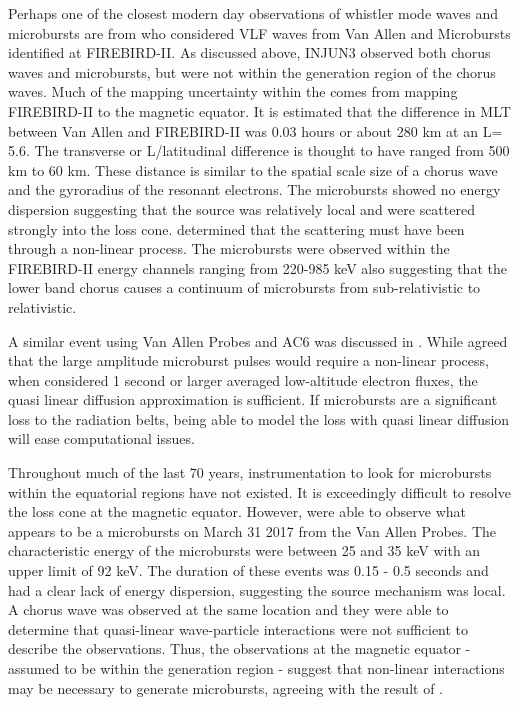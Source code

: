 \documentclass[referee,a4paper,12pt,traditabstract]{swsc}
\begin{document}
\begin{linenumbers}
Perhaps one of the closest modern day observations of whistler mode waves and microbursts are from \citet{Breneman2017} who considered VLF waves from Van Allen and Microbursts identified at FIREBIRD-II. As discussed above, INJUN3 observed both chorus waves and microbursts, but were not within the generation region of the chorus waves. Much of the mapping uncertainty within the \citet{Breneman2017} comes from mapping FIREBIRD-II to the magnetic equator. It is estimated that the difference in MLT between Van Allen and FIREBIRD-II was 0.03 hours or about 280 km at an L= 5.6. The transverse or L/latitudinal difference is thought to have ranged from 500 km to 60 km. These distance is similar to the spatial scale size of a chorus wave and the gyroradius of the resonant electrons. The microbursts showed no energy dispersion suggesting that the source was relatively local and were scattered strongly into the loss cone. \citet{Breneman2017} determined that the scattering must have been through a non-linear process. The microbursts were observed within the FIREBIRD-II energy channels ranging from 220-985 keV also suggesting that the lower band chorus causes a continuum of microbursts from sub-relativistic to relativistic. 

A similar event using Van Allen Probes and AC6 was discussed in \citet{Mozer2018}. While \citet{Mozer2018} agreed that the large amplitude microburst pulses would require a non-linear process, when considered 1 second or larger averaged low-altitude electron fluxes, the quasi linear diffusion approximation is sufficient. If microbursts are a significant loss to the radiation belts, being able to model the loss with quasi linear diffusion will ease computational issues. 


Throughout much of the last 70 years, instrumentation to look for microbursts within the equatorial regions have not existed. It is exceedingly difficult to resolve the loss cone at the magnetic equator. However, \citet{Shumko2018b} were able to observe what appears to be a microbursts on March 31 2017 from the Van Allen Probes. The characteristic energy of the microbursts were between 25 and 35 keV with an upper limit of 92 keV. The duration of these events was 0.15 - 0.5 seconds and had a clear lack of energy dispersion, suggesting the source mechanism was local. A chorus wave was observed at the same location and they were able to determine that quasi-linear wave-particle interactions were not sufficient to describe the observations. Thus, the observations at the magnetic equator - assumed to be within the generation region - suggest that non-linear interactions may be necessary to generate microbursts, agreeing with the result of \citet{Breneman2017}. 




\end{linenumbers}
\end{document}
